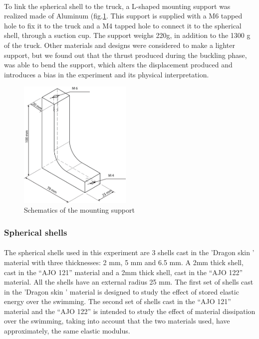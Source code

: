 \paragraph{}
To link the spherical shell to the truck, a L-shaped mounting support was realized made of Aluminum (fig.\ref{fig:mounting_support}. This support is supplied with a M6 tapped hole to fix it to the truck and a M4 tapped hole to connect it to the spherical shell, through a suction cup. The support weighs 220g, in addition to the 1300 g of the truck. Other materials and designs were considered to make a lighter support, but we found out that the thrust produced during the buckling phase, was able to bend the support, which alters the displacement produced and introduces a bias in the experiment and its physical interpretation.
\begin{figure}[H] %
	\centering%
	\includegraphics[width=0.48\textwidth]{figures/Chapter_1/Support.png}
	\caption{Schematics of the mounting support}
	\label{fig:mounting_support}
\end{figure}

\subsubsection{Spherical shells}
\paragraph{}
The spherical shells used in this experiment are 3 shells cast in the 'Dragon skin ' material with three thicknesses: 2 mm, 5 mm and 6.5 mm. A 2mm thick shell, cast in the "`AJO 121"' material and a 2mm thick shell, cast in the "`AJO 122"' material. All the shells have an external radius 25 mm. 
The first set of shells cast in the 'Dragon skin ' material is designed to study the effect of stored elastic energy over the swimming.
The second set of shells cast in the "`AJO 121"' material and the "`AJO 122"' is intended to study the effect of material dissipation over the swimming, taking into account that the two materials used, have approximately, the same elastic modulus.
